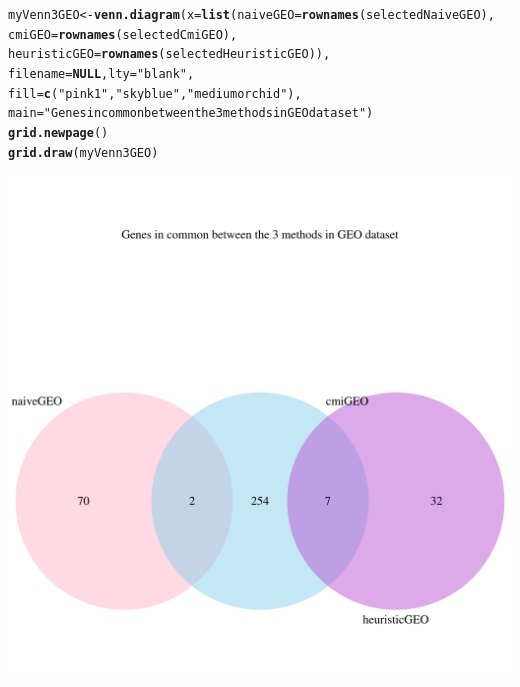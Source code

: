 \documentclass[a4paper,10pt]{article}\usepackage[]{graphicx}\usepackage[]{color}
\makeatletter
\def\maxwidth{ %
  \ifdim\Gin@nat@width>\linewidth
    \linewidth
  \else
    \Gin@nat@width
  \fi
}
\newcommand{\hlstr}[1]{\textcolor[rgb]{0.192,0.494,0.8}{#1}}%
\newcommand{\hlstd}[1]{\textcolor[rgb]{0.345,0.345,0.345}{#1}}%
\newcommand{\hlkwa}[1]{\textcolor[rgb]{0.161,0.373,0.58}{\textbf{#1}}}%
\newcommand{\hlkwb}[1]{\textcolor[rgb]{0.69,0.353,0.396}{#1}}%
\newcommand{\hlkwc}[1]{\textcolor[rgb]{0.333,0.667,0.333}{#1}}%
\newcommand{\hlkwd}[1]{\textcolor[rgb]{0.737,0.353,0.396}{\textbf{#1}}}%
\newenvironment{kframe}{%
 \def\at@end@of@kframe{}%
 \ifinner\ifhmode%
  \def\at@end@of@kframe{\end{minipage}}%
  \begin{minipage}{\columnwidth}%
 \fi\fi%
 \def\FrameCommand##1{\hskip\@totalleftmargin \hskip-\fboxsep
 \colorbox{shadecolor}{##1}\hskip-\fboxsep
     \hskip-\linewidth \hskip-\@totalleftmargin \hskip\columnwidth}%
 \MakeFramed {\advance\hsize-\width
   \@totalleftmargin\z@ \linewidth\hsize
   \@setminipage}}%
 {\par\unskip\endMakeFramed%
 \at@end@of@kframe}
\newenvironment{knitrout}{}{} %
\makeatother
\begin{document}
\begin{knitrout}
\color{fgcolor}\begin{kframe}
\begin{alltt}
\hlstd{myVenn3GEO}\hlkwb{<-} \hlkwd{venn.diagram}\hlstd{(}\hlkwc{x}\hlstd{=}\hlkwd{list}\hlstd{(}\hlkwc{naiveGEO}\hlstd{=}\hlkwd{rownames}\hlstd{(selectedNaiveGEO),}
                                \hlkwc{cmiGEO}\hlstd{=}\hlkwd{rownames}\hlstd{(selectedCmiGEO),}
                                \hlkwc{heuristicGEO} \hlstd{=} \hlkwd{rownames}\hlstd{(selectedHeuristicGEO)),}
                                \hlkwc{filename}\hlstd{=}\hlkwa{NULL}\hlstd{,} \hlkwc{lty} \hlstd{=} \hlstr{"blank"}\hlstd{,}
                                \hlkwc{fill}\hlstd{=}\hlkwd{c}\hlstd{(}\hlstr{"pink1"}\hlstd{,} \hlstr{"skyblue"}\hlstd{,} \hlstr{"mediumorchid"}\hlstd{),}
                       \hlkwc{main}\hlstd{=}\hlstr{"Genes in common between the 3 methods in GEO dataset"}\hlstd{)}
\hlkwd{grid.newpage}\hlstd{()}
\hlkwd{grid.draw}\hlstd{(myVenn3GEO)}
\end{alltt}
\end{kframe}
\includegraphics[width=\maxwidth]{figure/compare3GEO-1} 

\end{knitrout}
\end{document}
